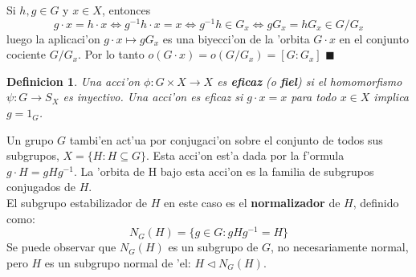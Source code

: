\documentclass[a4paper,openright,12pt]{report}
\numberwithin{equation}{section} %
\newtheorem{definicion}{Definicion}[section] %
\newenvironment{proof}{\noindent{\it Demostracion:}}{\hfill$\blacksquare$} %
\begin{document}
\begin{proof}
Si $h,g \in G$ y $x \in X$, entonces
\[
g \cdot x = h \cdot x \Longleftrightarrow g^{-1}h \cdot x = x \Longleftrightarrow g^{-1}h \in G_{x} \Longleftrightarrow gG_{x} = hG_{x} \in G/G_{x}
\]
luego la aplicaci'on $g \cdot x \mapsto gG_{x}$ es una biyecci'on de la 'orbita $G \cdot x$ en el conjunto cociente $G/G_{x}$. Por lo tanto $o(G \cdot x)=o(G/G_ {x})=[G:G_{x}]$
\end{proof}
\begin{definicion}
Una acci'on $\phi : G \times X \rightarrow X$ es \textbf{eficaz} (o \textbf{fiel}) si el homomorfismo $\psi : G \rightarrow S_{X}$ es inyectivo. Una acci'on es eficaz si $g \cdot x=x$ para todo $x \in X$ implica $g=1_{G}$.
\end{definicion}
Un grupo $G$ tambi'en act'ua por conjugaci'on sobre el conjunto de todos sus subgrupos, $X=\{H:H\subseteq G \}$. Esta acci'on est'a dada por la f'ormula $g \cdot H = gHg^{-1} $. La 'orbita de H bajo esta acci'on es la familia de subgrupos conjugados de $H$. \\
El subgrupo estabilizador de $H$ en este caso es el \textbf{normalizador} de $H$, definido como:
\[
N_{G}(H)=\{g \in G : gHg^{-1}=H  \}
\]
Se puede observar que $N_{G}(H)$ es un subgrupo de $G$, no necesariamente normal, pero $H$ es un subgrupo normal de 'el: $H \triangleleft N_{G}(H)$.
\end{document}
